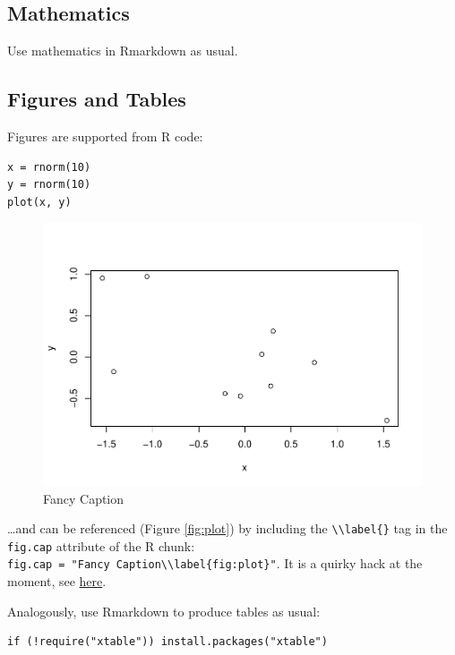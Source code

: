 \documentclass[Royal,times,sageh]{sagej}
\begin{document}
\hypertarget{mathematics}{%
\subsection{Mathematics}\label{mathematics}}

Use mathematics in Rmarkdown as usual.

\hypertarget{figures-and-tables}{%
\subsection{Figures and Tables}\label{figures-and-tables}}

Figures are supported from R code:

\begin{verbatim}
x = rnorm(10)
y = rnorm(10)
plot(x, y)
\end{verbatim}

\begin{figure}
\includegraphics[width=1\linewidth]{achievement_gap_files/figure-latex/plot-ref-1} \caption{Fancy Caption\label{fig:plot}}\label{fig:plot-ref}
\end{figure}

\ldots and can be referenced (Figure \ref{fig:plot}) by including the
\texttt{\textbackslash{}\textbackslash{}label\{\}} tag in the
\texttt{fig.cap} attribute of the R chunk:
\texttt{fig.cap\ =\ "Fancy\ Caption\textbackslash{}\textbackslash{}label\{fig:plot\}"}.
It is a quirky hack at the moment, see
\href{https://github.com/yihui/knitr/issues/323}{here}.

Analogously, use Rmarkdown to produce tables as usual:

\begin{verbatim}
if (!require("xtable")) install.packages("xtable")
\end{verbatim}
\end{document}
